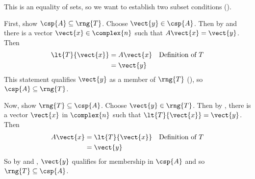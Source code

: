 This is an equality of sets, so we want to establish two subset conditions ().\par
%
First, show $\csp{A}\subseteq\rng{T}$.  Choose $\vect{y}\in\csp{A}$.  Then by  and  there is a vector $\vect{x}\in\complex{n}$ such that $A\vect{x}=\vect{y}$.  Then
%
\begin{align*}
\lt{T}{\vect{x}}
&=A\vect{x}&&\text{Definition of $T$}\\
&=\vect{y}
\end{align*}
%
This statement qualifies $\vect{y}$ as a member of $\rng{T}$ (), so $\csp{A}\subseteq\rng{T}$.\par
%
Now, show $\rng{T}\subseteq\csp{A}$.  Choose $\vect{y}\in\rng{T}$.  Then by , there is a vector $\vect{x}$ in $\complex{n}$ such that $\lt{T}{\vect{x}}=\vect{y}$.  Then
%
\begin{align*}
A\vect{x}
&=\lt{T}{\vect{x}}&&\text{Definition of $T$}\\
&=\vect{y}
\end{align*}
%
So by  and , $\vect{y}$ qualifies for membership in $\csp{A}$ and so $\rng{T}\subseteq\csp{A}$.\par
